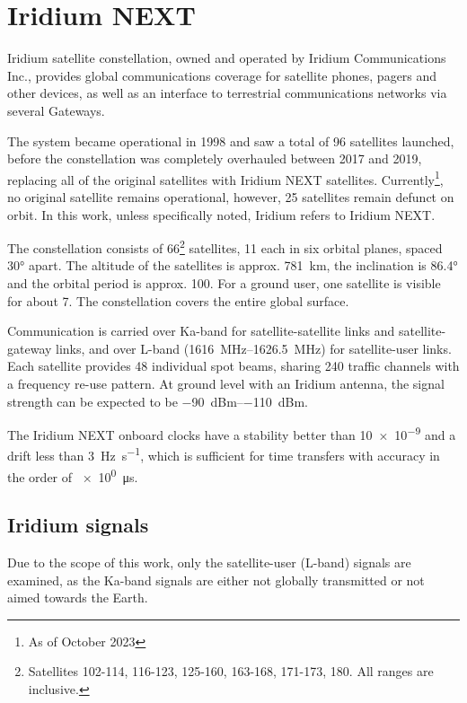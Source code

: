 \section{Iridium NEXT}
\label{s_sat_iridium}
Iridium satellite constellation, owned and operated by Iridium Communications Inc., provides global communications coverage for satellite phones, pagers and other devices, as well as an interface to terrestrial communications networks via several Gateways.

The system became operational in 1998 and saw a total of 96 satellites launched, before the constellation was completely overhauled between 2017 and 2019, replacing all of the original satellites with Iridium NEXT satellites. Currently\footnote{As of October 2023}, no original satellite remains operational, however, 25 satellites remain defunct on orbit\cite{sat06}. In this work, unless specifically noted, Iridium refers to Iridium NEXT.

The constellation consists of 66\footnote{Satellites 102-114, 116-123, 125-160, 163-168, 171-173, 180. All ranges are inclusive.} satellites, 11 each in six orbital planes, spaced \ang{30} apart. The altitude of the satellites is approx. \qty{781}{\km}, the inclination is \ang{86.4} and the orbital period is approx. \qty{100}{\min}. For a ground user, one satellite is visible for about \qty{7}{\min}. The constellation covers the entire global surface\cite{sat01}.

Communication is carried over Ka-band for satellite-satellite links and satellite-gateway links, and over L-band (\qtyrange{1616}{1626.5}{\mega\hertz}) for satellite-user links. Each satellite provides 48 individual spot beams, sharing 240 traffic channels with a frequency re-use pattern\cite{sat07}. At ground level with an Iridium antenna, the signal strength can be expected to be \qtyrange{-90}{-110}{dBm}\cite{sop01}.

The Iridium NEXT onboard clocks have a stability better than \num{10e-9} and a drift less than \qty{3}{\hertz\per\s}, which is sufficient for time transfers with accuracy in the order of \qty{e0}{\micro\s}\cite{sop11}.
\subsection{Iridium signals}
\label{s_sat_iridium_signals}
Due to the scope of this work, only the satellite-user (L-band) signals are examined, as the Ka-band signals are either not globally transmitted or not aimed towards the Earth.

